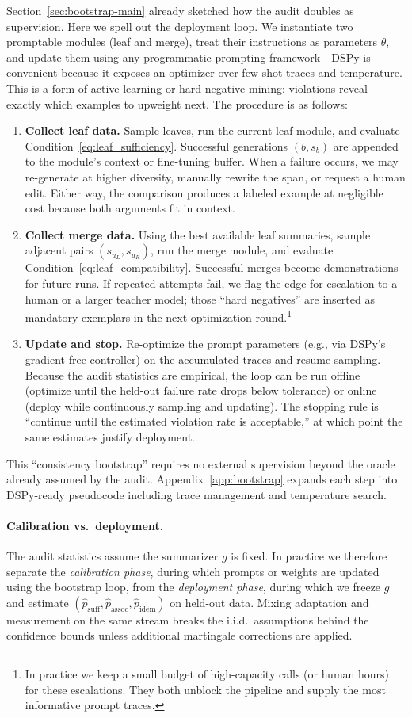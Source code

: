 Section~\ref{sec:bootstrap-main} already sketched how the audit doubles as supervision. Here we spell out the deployment loop. We instantiate two promptable modules (leaf and merge), treat their instructions as parameters $\theta$, and update them using any programmatic prompting framework---DSPy \citep{khattab2024dspy} is convenient because it exposes an optimizer over few-shot traces and temperature. This is a form of active learning or hard-negative mining: violations reveal exactly which examples to upweight next. The procedure is as follows:
\begin{enumerate}
    \item \textbf{Collect leaf data.} Sample leaves, run the current leaf module, and evaluate Condition~\eqref{eq:leaf_sufficiency}. Successful generations $(b, s_b)$ are appended to the module's context or fine-tuning buffer. When a failure occurs, we may re-generate at higher diversity, manually rewrite the span, or request a human edit. Either way, the comparison produces a labeled example at negligible cost because both arguments fit in context.
    \item \textbf{Collect merge data.} Using the best available leaf summaries, sample adjacent pairs $(s_{u_L}, s_{u_R})$, run the merge module, and evaluate Condition~\eqref{eq:leaf_compatibility}. Successful merges become demonstrations for future runs. If repeated attempts fail, we flag the edge for escalation to a human or a larger teacher model; those ``hard negatives'' are inserted as mandatory exemplars in the next optimization round.\footnote{In practice we keep a small budget of high-capacity calls (or human hours) for these escalations. They both unblock the pipeline and supply the most informative prompt traces.}
    \item \textbf{Update and stop.} Re-optimize the prompt parameters (e.g., via DSPy's gradient-free controller) on the accumulated traces and resume sampling. Because the audit statistics are empirical, the loop can be run offline (optimize until the held-out failure rate drops below tolerance) or online (deploy while continuously sampling and updating). The stopping rule is ``continue until the estimated violation rate is acceptable,'' at which point the same estimates justify deployment.
\end{enumerate}
This ``consistency bootstrap'' requires no external supervision beyond the oracle already assumed by the audit. Appendix~\ref{app:bootstrap} expands each step into DSPy-ready pseudocode including trace management and temperature search.

\paragraph{Calibration vs.\ deployment.}
The audit statistics assume the summarizer $g$ is fixed. In practice we therefore separate the \emph{calibration phase}, during which prompts or weights are updated using the bootstrap loop, from the \emph{deployment phase}, during which we freeze $g$ and estimate $(\hat{p}_{\text{suff}},\hat{p}_{\text{assoc}},\hat{p}_{\text{idem}})$ on held-out data. Mixing adaptation and measurement on the same stream breaks the i.i.d.\ assumptions behind the confidence bounds unless additional martingale corrections are applied.
